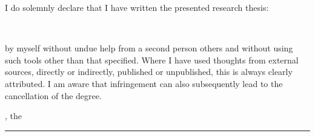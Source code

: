I do solemnly declare that I have written the presented research thesis:

\begin{center}
  \textit{\glqq\titel\grqq}\\[1em]
\end{center}

by myself without undue help from a second person others and without using such tools
other than that specified. Where I have used thoughts from external sources, directly or
indirectly, published or unpublished, this is always clearly attributed. I am aware that
infringement can also subsequently lead to the cancellation of the degree.
\par
\ort, the \eingereicht

\rule[-0.2cm]{5cm}{0.5pt}

\textsc{\autor}
